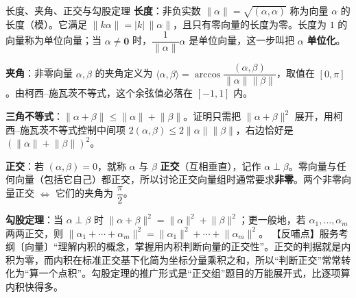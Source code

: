 \begin{fdeep}{长度、夹角、正交与勾股定理}
\textbf{长度}：非负实数 $\lVert\alpha\rVert=\sqrt{(\alpha,\alpha)}$ 称为向量 $\alpha$ 的长度（模）。它满足 $\lVert k\alpha\rVert=\lvert k\rvert\,\lVert\alpha\rVert$，且只有零向量的长度为零。长度为 $1$ 的向量称为单位向量；当 $\alpha\ne\mathbf{0}$ 时，$\dfrac{1}{\lVert\alpha\rVert}\alpha$ 是单位向量，这一步叫把 $\alpha$ \textbf{单位化}。

\textbf{夹角}：非零向量 $\alpha,\beta$ 的夹角定义为 $\langle\alpha,\beta\rangle=\arccos\dfrac{(\alpha,\beta)}{\lVert\alpha\rVert\lVert\beta\rVert}$，取值在 $[0,\pi]$。由柯西–施瓦茨不等式，这个余弦值必落在 $[-1,1]$ 内。

\textbf{三角不等式}：$\lVert\alpha+\beta\rVert\le\lVert\alpha\rVert+\lVert\beta\rVert$。证明只需把 $\lVert\alpha+\beta\rVert^2$ 展开，用柯西–施瓦茨不等式控制中间项 $2(\alpha,\beta)\le2\lVert\alpha\rVert\lVert\beta\rVert$，右边恰好是 $(\lVert\alpha\rVert+\lVert\beta\rVert)^2$。

\textbf{正交}：若 $(\alpha,\beta)=0$，就称 $\alpha$ 与 $\beta$ \textbf{正交}（互相垂直），记作 $\alpha\perp\beta$。零向量与任何向量（包括它自己）都正交，所以讨论正交向量组时通常要求\textbf{非零}。两个非零向量正交 $\iff$ 它们的夹角为 $\dfrac{\pi}{2}$。

\textbf{勾股定理}：当 $\alpha\perp\beta$ 时 $\lVert\alpha+\beta\rVert^2=\lVert\alpha\rVert^2+\lVert\beta\rVert^2$；更一般地，若 $\alpha_1,\dots,\alpha_m$ 两两正交，则 $\lVert\alpha_1+\cdots+\alpha_m\rVert^2=\lVert\alpha_1\rVert^2+\cdots+\lVert\alpha_m\rVert^2$。
【反哺点】服务考纲〔向量〕“理解内积的概念，掌握用内积判断向量的正交性”。正交的判据就是内积为零，而内积在标准正交基下化简为坐标分量乘积之和，所以“判断正交”常常转化为“算一个点积”。勾股定理的推广形式是“正交组”题目的万能展开式，比逐项算内积快得多。
\end{fdeep}

